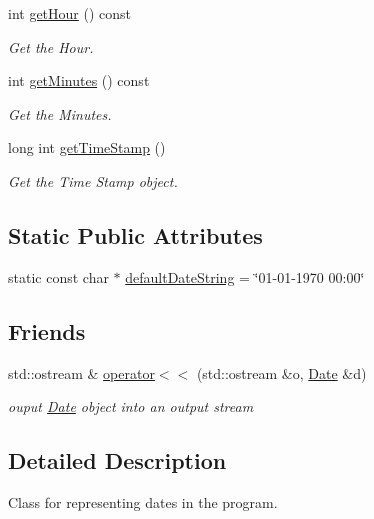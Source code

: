 \begin{DoxyCompactItemize}
int \mbox{\hyperlink{classDate_ab8ea9e1aafa6cb95be7b82cda0c53cfe}{get\+Hour}} () const
\begin{DoxyCompactList}\small\item\em Get the Hour. \end{DoxyCompactList}\item 
int \mbox{\hyperlink{classDate_a55251df891f43b9f19419cd79ce69876}{get\+Minutes}} () const
\begin{DoxyCompactList}\small\item\em Get the Minutes. \end{DoxyCompactList}\item 
long int \mbox{\hyperlink{classDate_af047ef9ca2cf7843b921f36e9883f0a7}{get\+Time\+Stamp}} ()
\begin{DoxyCompactList}\small\item\em Get the Time Stamp object. \end{DoxyCompactList}\end{DoxyCompactItemize}
\subsection*{Static Public Attributes}
\begin{DoxyCompactItemize}
\item 
static const char $\ast$ \mbox{\hyperlink{classDate_ac3833dc0b7e3f62bac56195d48522f71}{default\+Date\+String}} = \char`\"{}01-\/01-\/1970 00\+:00\char`\"{}
\end{DoxyCompactItemize}
\subsection*{Friends}
\begin{DoxyCompactItemize}
\item 
std\+::ostream \& \mbox{\hyperlink{classDate_a2f114c7aa1398dac0f21b888bcb40f3e}{operator$<$$<$}} (std\+::ostream \&o, \mbox{\hyperlink{classDate}{Date}} \&d)
\begin{DoxyCompactList}\small\item\em ouput \mbox{\hyperlink{classDate}{Date}} object into an output stream \end{DoxyCompactList}\end{DoxyCompactItemize}


\subsection{Detailed Description}
Class for representing dates in the program. 

